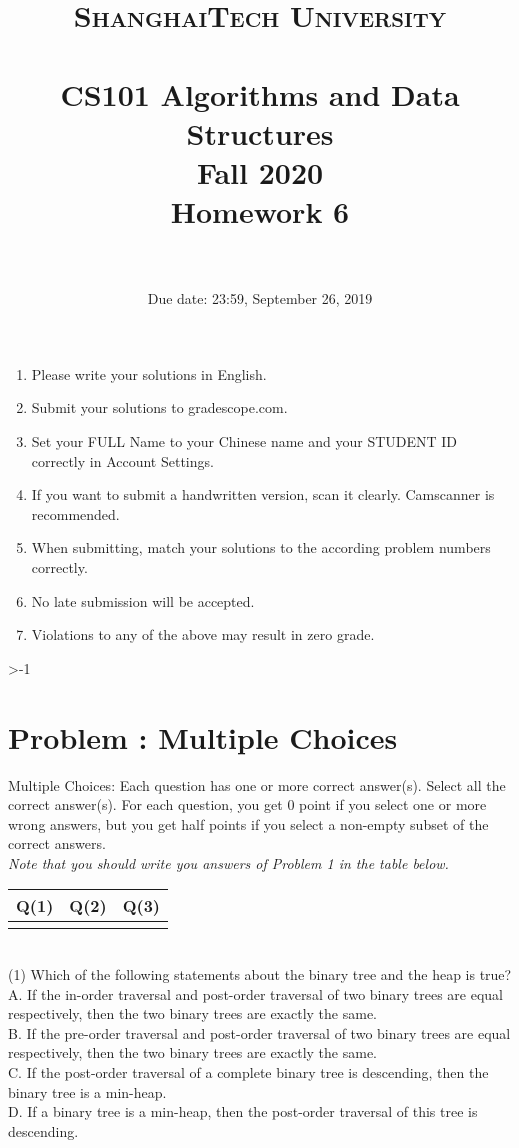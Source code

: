 \documentclass[10.5pt]{article}
\title{
    \normalfont \normalsize
    \textsc{ShanghaiTech University} \\ [25pt]
    \horrule{0.5pt} \\[0.4cm] %
    \huge CS101 Algorithms and Data Structures\\ %
    \LARGE Fall 2020\\
    \LARGE Homework 6\\
    \horrule{2pt} \\[0.5cm] %
}
\author{}
\date{Due date: 23:59, September 26, 2019}
\newcounter{ProblemCounter}
\newcounter{oldvalue}
\newcommand{\problem}[2][-1]{
    \setcounter{oldvalue}{\value{secnumdepth}}
    \setcounter{secnumdepth}{0}
    \ifnum#1>-1
        \setcounter{ProblemCounter}{0}
    \else
        \stepcounter{ProblemCounter}
    \fi
    \section{Problem \arabic{ProblemCounter}: #2}
    \setcounter{secnumdepth}{\value{oldvalue}}
}
\begin{document}
\maketitle
\thispagestyle{firstpage}
\vspace{3ex}

\begin{enumerate}
\item Please write your solutions in English. 

\item Submit your solutions to gradescope.com.  

\item Set your FULL Name to your Chinese name and your STUDENT ID correctly in Account Settings. 

\item If you want to submit a handwritten version, scan it clearly. Camscanner is recommended. 

\item When submitting, match your solutions to the according problem numbers correctly. 

\item No late submission will be accepted.

\item Violations to any of the above may result in zero grade. 
\end{enumerate}
\newpage


\problem{Multiple Choices}
Multiple Choices: Each question has one or more correct answer(s). Select all the correct answer(s). For each question, you get $0$ point if you select one or more wrong answers, but you get half points if you select a non-empty subset of the correct answers.\\
\textit{Note that you should write you answers of Problem 1 in the table below.}
\begin{table}[htbp]
\begin{tabular}{|p{1.5cm}|p{1.5cm}|p{1.5cm}|}
\hline 
Q(1) & Q(2) & Q(3) \\
\hline 
&&\\ 
\hline 
\end{tabular} 
\end{table} \\
(1) Which of the following statements about the binary tree and the heap is true? \\
A. If the in-order traversal and post-order traversal of two binary trees are equal respectively, then the two binary trees are exactly the same. \\
B. If the pre-order traversal and post-order traversal of two binary trees are equal respectively, then the two binary trees are exactly the same. \\
C. If the post-order traversal of a complete binary tree is descending, then the binary tree is a min-heap. \\
D. If a binary tree is a min-heap, then the post-order traversal of this tree is descending.\\
\end{document}
